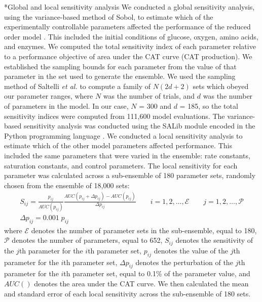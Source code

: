 \documentclass[12pt]{article}
\makeatletter
\renewcommand\subsection{\@startsection
	{subsection}{2}{0mm}
	{-0.05in}
	{-0.5\baselineskip}
	{\normalfont\normalsize\bfseries}}
\makeatother
\begin{document}
\subsection*{Global and local sensitivity analysis}
We conducted a global sensitivity analysis, using the variance-based method of Sobol, to estimate which of the experimentally controllable parameters affected the performance of the reduced order model \citep{SOBOL_METHOD}.
This included the initial conditions of glucose, oxygen, amino acids, and enzymes.
We computed the total sensitivity index of each parameter relative to a performance objective of area under the CAT curve (CAT production).
We established the sampling bounds for each parameter from the value of that parameter in the set used to generate the ensemble.
We used the sampling method of Saltelli \textit{et al.} \citep{Saltelli:2010} to compute a family of $N\left(2d+2\right)$ sets which obeyed our parameter ranges,
where $N$ was the number of trials, and $d$ was the number of parameters in the model. In our case, $N$ = 300 and $d$ = 185, so the total sensitivity indices were computed from
111,600 model evaluations. The variance-based sensitivity analysis was conducted using the SALib module encoded in the Python programming language \citep{SALIB}.
We conducted a local sensitivity analysis to estimate which of the other model parameters affected performance.
This included the same parameters that were varied in the ensemble: rate constants, saturation constants, and control parameters.
The local sensitivity for each parameter was calculated across a sub-ensemble of 180 parameter sets, randomly chosen from the ensemble of 18,000 sets:
\begin{equation}\label{eqn:local-sensitivity}
\begin{split}
    S_{ij}=\frac{p_{ij}}{AUC(p_{ij})}\frac{AUC(p_{ij}+\Delta p_{ij})-AUC(p_{ij})}{\Delta p_{ij}}\qquad{i=1,2,\hdots,\mathcal{E}}\qquad{j=1,2,\hdots,\mathcal{P}} \\
    \Delta p_{ij}=0.001\;p_{ij}\qquad\qquad\qquad\qquad\qquad\qquad\qquad\qquad\qquad\qquad\qquad
\end{split}
\end{equation}
where $\mathcal{E}$ denotes the number of parameter sets in the sub-ensemble, equal to 180, $\mathcal{P}$ denotes the number of parameters, equal to 652, $S_{ij}$ denotes the sensitivity of the $j$th parameter for the $i$th parameter set, $p_{ij}$ denotes the value of the $j$th parameter for the $i$th parameter set, $\Delta p_{ij}$ denotes the perturbation of the $j$th parameter for the $i$th parameter set, equal to 0.1\% of the parameter value, and $AUC()$ denotes the area under the CAT curve.
We then calculated the mean and standard error of each local sensitivity across the sub-ensemble of 180 sets.
\end{document}

